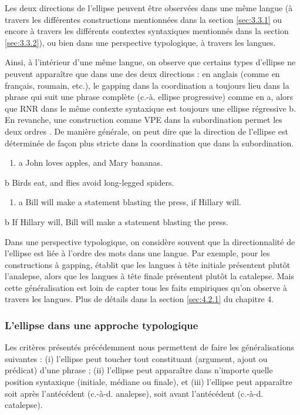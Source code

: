 Les deux directions de l'ellipse peuvent être observées dans une même langue (à travers les différentes constructions mentionnées dans la section \ref{sec:3.3.1} ou encore à travers les différents contextes syntaxiques mentionnés dans la section \ref{sec:3.3.2}), ou bien dans une perspective typologique, à travers les langues. 

Ainsi, à l'intérieur d'une même langue, on observe que certains types d'ellipse ne peuvent apparaître que dans une des deux directions : en anglais (comme en français, roumain, etc.), le gapping dans la coordination a toujours lieu dans la phrase qui suit une phrase complète (c.-à. ellipse progressive) comme en a, alors que RNR dans le même contexte syntaxique est toujours une ellipse régressive b. En revanche, une construction comme VPE dans la subordination permet les deux ordres . De manière générale, on peut dire que la direction de l'ellipse est déterminée de façon plus stricte dans la coordination que dans la subordination. 


\begin{enumerate}
\item \label{bkm:Ref306122971}a  John loves apples, and Mary bananas. 


\end{enumerate}
  b  Birds eat, and flies avoid long-legged spiders.  


\begin{enumerate}
\item \label{bkm:Ref306123001}a  Bill will make a statement blasting the press, if Hillary will. 


\end{enumerate}
  b  If Hillary will, Bill will make a statement blasting the press.  

Dans une perspective typologique, on considère souvent que la directionnalité de l'ellipse est liée à l'ordre des mots dans une langue. Par exemple, pour les constructions à gapping, \citet{Ross1970} établit que les langues à tête initiale présentent plutôt l'analepse, alors que les langues à tête finale présentent plutôt la catalepse. Mais cette généralisation est loin de capter tous les faits empiriques qu'on observe à travers les langues. Plus de détails dans la section \ref{sec:4.2.1} du chapitre 4.

\subsubsection{L'ellipse dans une approche typologique}
Les critères présentés précédemment nous permettent de faire les généralisations suivantes : (i) l'ellipse peut toucher tout constituant (argument, ajout ou prédicat) d'une phrase ; (ii) l'ellipse peut apparaître dans n'importe quelle position syntaxique (initiale, médiane ou finale), et (iii) l'ellipse peut apparaître soit après l'antécédent (c.-à-d. analepse), soit avant l'antécédent (c.-à-d. catalepse).

